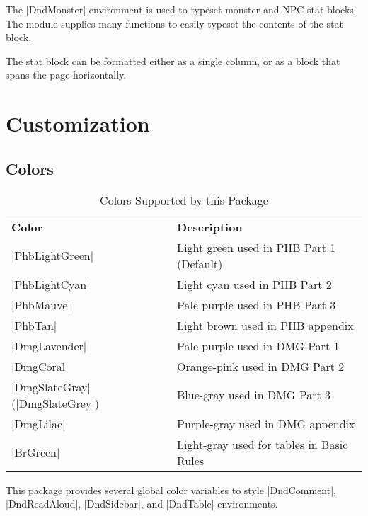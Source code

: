 \documentclass[letterpaper,twocolumn,openany,nodeprecatedcode]{dndbook}
\begin{document}
The |DndMonster| environment is used to typeset monster and NPC stat blocks. The module supplies many functions to easily typeset the contents of the stat block.

The stat block can be formatted either as a single column, or as a block that spans the page horizontally.

\part{Customization}

\chapter{Colors}

\begin{table*}[b]
  \caption{\DndFontTableTitle{}Colors Supported by this Package}\label{tab:colors}

  \begin{tabularx}{\linewidth}{lX}
    \textbf{Color}                  & \textbf{Description} \\
    \rowcolor{PhbLightGreen}
    |PhbLightGreen|                 & Light green used in PHB Part 1 (Default) \\
    \rowcolor{PhbLightCyan}
    |PhbLightCyan|                  & Light cyan used in PHB Part 2 \\
    \rowcolor{PhbMauve}
    |PhbMauve|                      & Pale purple used in PHB Part 3 \\
    \rowcolor{PhbTan}
    |PhbTan|                        & Light brown used in PHB appendix \\
    \rowcolor{DmgLavender}
    |DmgLavender|                   & Pale purple used in DMG Part 1 \\
    \rowcolor{DmgCoral}
    |DmgCoral|                      & Orange-pink used in DMG Part 2 \\
    \rowcolor{DmgSlateGray}
    |DmgSlateGray| (|DmgSlateGrey|) & Blue-gray used in DMG Part 3 \\
    \rowcolor{DmgLilac}
    |DmgLilac|                      & Purple-gray used in DMG appendix \\
    \rowcolor{BrGreen}
    |BrGreen|                       & Light-gray used for tables in Basic Rules\\
  \end{tabularx}
\end{table*}

This package provides several global color variables to style |DndComment|, |DndReadAloud|, |DndSidebar|, and |DndTable| environments.
\end{document}

